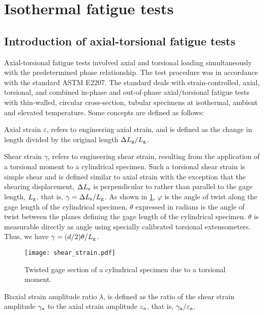 \section{Isothermal fatigue tests}
\subsection{Introduction of axial-torsional fatigue tests}
\noindent
Axial-torsional fatigue tests involved axial and torsional loading simultaneously with the predetermined phase relationship.
The test procedure was in accordance with the standard ASTM E2207.
The standard deals with strain-controlled, axial, torsional, and combined in-phase and out-of-phase axial/torsional fatigue tests with thin-walled, circular cross-section, tubular specimens at isothermal, ambient and elevated temperature.
Some concepts are defined as follows:

Axial strain $\varepsilon$, refers to engineering axial strain, and is defined as the change in length divided by the original length $\Delta L_{\rm{g}}/L_{\rm{g}}$.

Shear strain $\gamma$, refers to engineering shear strain, resulting from the application of a torsional moment to a cylindrical specimen.
Such a torsional shear strain is simple shear and is defined similar to axial strain with the exception that the shearing displacement, $\Delta L_{\rm{s}}$ is perpendicular to rather than parallel to the gage length, $L_{\rm{g}}$, that is, $\gamma=\Delta L_{\rm{s}}/L_{\rm{g}}$.
As shown in \ref{Fig:Shear_Strain}, $\varphi$ is the angle of twist along the gage length of the cylindrical specimen, $\theta$ expressed in radians is the angle of twist between the planes defining the gage length of the cylindrical specimen.
$\theta$ is measurable directly as angle using specially calibrated torsional extensometers.
Thus, we have $\gamma = (d/2)\theta/ L_{\rm{g}}$.

\begin{figure}[!htp]
  \centering
  \texttt{[image: shear\_strain.pdf]}
  \caption{Twisted gage section of a cylindrical specimen due to a torsional moment.}
  \label{Fig:Shear_Strain}
\end{figure}

Biaxial strain amplitude ratio $\lambda$, is defined as the ratio of the shear strain amplitude $\gamma_{\rm{a}}$ to the axial strain amplitude $\varepsilon_{\rm{a}}$, that is, $\gamma_{\rm{a}}/\varepsilon_{\rm{a}}$.

